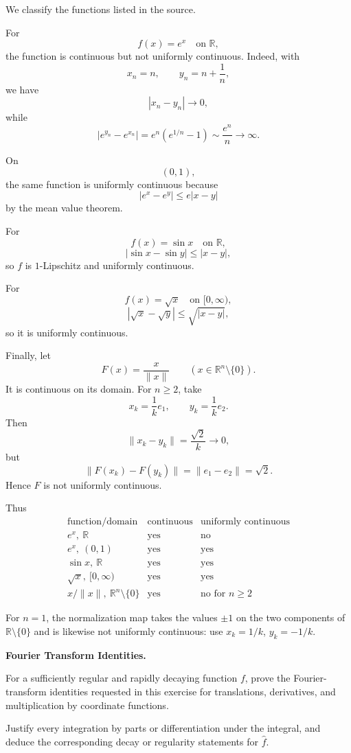 \begin{solution}
We classify the functions listed in the source.

For
\[
f(x)=e^x
\quad\text{on }\mathbb R,
\]
the function is continuous but not uniformly continuous. Indeed, with
\[
x_n=n,\qquad y_n=n+\frac1n,
\]
we have
\[
|x_n-y_n|\to0,
\]
while
\[
|e^{y_n}-e^{x_n}|
=
e^n(e^{1/n}-1)
\sim
\frac{e^n}{n}
\to\infty.
\]

On
\[
(0,1),
\]
the same function is uniformly continuous because
\[
|e^x-e^y|
\le
e|x-y|
\]
by the mean value theorem.

For
\[
f(x)=\sin x
\quad\text{on }\mathbb R,
\]
\[
|\sin x-\sin y|
\le
|x-y|,
\]
so \(f\) is \(1\)-Lipschitz and uniformly continuous.

For
\[
f(x)=\sqrt x
\quad\text{on }[0,\infty),
\]
\[
|\sqrt x-\sqrt y|
\le
\sqrt{|x-y|},
\]
so it is uniformly continuous.

Finally, let
\[
F(x)=\frac{x}{\|x\|}
\qquad
(x\in\mathbb R^n\setminus\{0\}).
\]
It is continuous on its domain. For \(n\ge2\), take
\[
x_k=\frac1k e_1,
\qquad
y_k=\frac1k e_2.
\]
Then
\[
\|x_k-y_k\|
=
\frac{\sqrt2}{k}
\to0,
\]
but
\[
\|F(x_k)-F(y_k)\|
=
\|e_1-e_2\|
=
\sqrt2.
\]
Hence \(F\) is not uniformly continuous.

Thus
\[
\boxed{
\begin{array}{c|c|c}
\text{function/domain}&\text{continuous}&\text{uniformly continuous}\\ \hline
e^x,\ \mathbb R&\text{yes}&\text{no}\\
e^x,\ (0,1)&\text{yes}&\text{yes}\\
\sin x,\ \mathbb R&\text{yes}&\text{yes}\\
\sqrt x,\ [0,\infty)&\text{yes}&\text{yes}\\
x/\|x\|,\ \mathbb R^n\setminus\{0\}&\text{yes}&\text{no for }n\ge2
\end{array}
}
\]

For \(n=1\), the normalization map takes the values \(\pm1\) on the two components of
\(\mathbb R\setminus\{0\}\) and is likewise not uniformly continuous: use
\(x_k=1/k\), \(y_k=-1/k\).
\end{solution}


\begin{problem}[CP-II-0110]
\label{prob:cp-ii-0110}
\textbf{Fourier Transform Identities.}

\hspace*{1.5em}For a sufficiently regular and rapidly decaying function \(f\), prove the
Fourier-transform identities requested in this exercise for translations,
derivatives, and multiplication by coordinate functions.

Justify every integration by parts or differentiation under the integral, and
deduce the corresponding decay or regularity statements for \(\widehat f\).
\end{problem}

